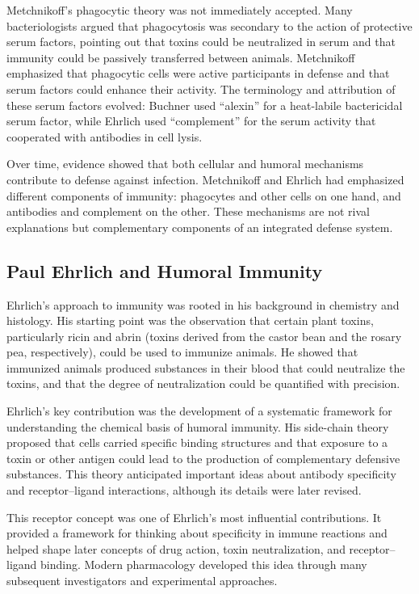 Metchnikoff's phagocytic theory was not immediately accepted. Many bacteriologists argued that phagocytosis was secondary to the action of protective serum factors, pointing out that toxins could be neutralized in serum and that immunity could be passively transferred between animals. Metchnikoff emphasized that phagocytic cells were active participants in defense and that serum factors could enhance their activity. The terminology and attribution of these serum factors evolved: Buchner used ``alexin'' for a heat-labile bactericidal serum factor, while Ehrlich used ``complement'' for the serum activity that cooperated with antibodies in cell lysis.\cite{metchnikoff-lecture}

Over time, evidence showed that both cellular and humoral mechanisms contribute to defense against infection. Metchnikoff and Ehrlich had emphasized different components of immunity: phagocytes and other cells on one hand, and antibodies and complement on the other. These mechanisms are not rival explanations but complementary components of an integrated defense system.

\subsection{Paul Ehrlich and Humoral Immunity}

Ehrlich's approach to immunity was rooted in his background in chemistry and histology. His starting point was the observation that certain plant toxins, particularly ricin and abrin (toxins derived from the castor bean and the rosary pea, respectively), could be used to immunize animals. He showed that immunized animals produced substances in their blood that could neutralize the toxins, and that the degree of neutralization could be quantified with precision.

Ehrlich's key contribution was the development of a systematic framework for understanding the chemical basis of humoral immunity. His side-chain theory proposed that cells carried specific binding structures and that exposure to a toxin or other antigen could lead to the production of complementary defensive substances. This theory anticipated important ideas about antibody specificity and receptor--ligand interactions, although its details were later revised.\cite{ehrlich-lecture}

This receptor concept was one of Ehrlich's most influential contributions. It provided a framework for thinking about specificity in immune reactions and helped shape later concepts of drug action, toxin neutralization, and receptor--ligand binding. Modern pharmacology developed this idea through many subsequent investigators and experimental approaches.

